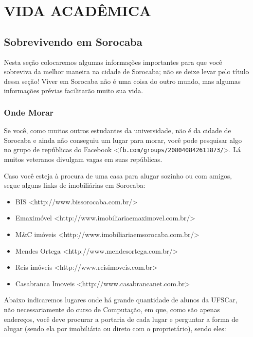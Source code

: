 \section{VIDA ACADÊMICA}
\subsection{Sobrevivendo em Sorocaba}
Nesta seção colocaremos algumas informações importantes para que você sobreviva da melhor maneira na cidade de Sorocaba; não se deixe levar pelo título dessa seção! Viver em Sorocaba não é uma coisa do outro mundo, mas algumas informações prévias facilitarão muito sua vida.

\subsubsection{Onde Morar}
Se você, como muitos outros estudantes da universidade, não é da cidade de Sorocaba e ainda não conseguiu um lugar para morar, você pode pesquisar algo no grupo de repúblicas do Facebook <\texttt{fb.com/groups/208040842611873/}>. Lá muitos veteranos divulgam vagas em suas repúblicas.

Caso você esteja à procura de uma casa para alugar sozinho ou com amigos, segue alguns  links de imobiliárias em Sorocaba:

\begin{itemize}
  \item BIS <http://www.bissorocaba.com.br/>
  \item Emaximóvel <http://www.imobiliariaemaximovel.com.br/>
  \item M\&C imóveis <http://www.imobiliariaemsorocaba.com.br/>
  \item Mendes Ortega <http://www.mendesortega.com.br/>
  \item Reis imóveis <http://www.reisimoveis.com.br>
  \item Casabranca Imoveis <http://www.casabrancanet.com.br>
\end{itemize}

Abaixo indicaremos lugares onde há grande quantidade de alunos da UFSCar, não necessariamente do curso de Computação, em que, como são apenas endereços, você deve procurar a portaria de cada lugar e perguntar a forma de alugar (sendo ela por imobiliária ou direto com o proprietário), sendo eles:


